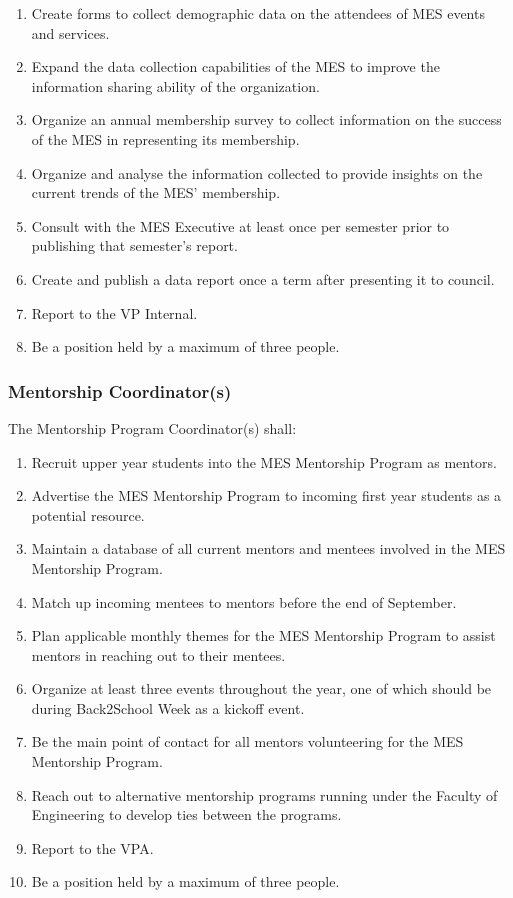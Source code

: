 \begin{enumerate}
 \item
  Create forms to collect demographic data on the attendees of MES events and services.
 \item
  Expand the data collection capabilities of the MES to improve the information sharing ability of the organization.
 \item
  Organize an annual membership survey to collect information on the success of the MES in representing its membership.
 \item
  Organize and analyse the information collected to provide insights on the current trends of the MES' membership.
 \item
  Consult with the MES Executive at least once per semester prior to publishing that semester's report.
 \item
  Create and publish a data report once a term after presenting it to council.
 \item
  Report to the VP Internal.
 \item
  Be a position held by a maximum of three people.
\end{enumerate}

\subsubsection{Mentorship Coordinator(s)}
\label{mentorship-coordinators}
The Mentorship Program Coordinator(s) shall:

\begin{enumerate}
 \item
  Recruit upper year students into the MES Mentorship Program as mentors.
 \item
  Advertise the MES Mentorship Program to incoming first year students as a potential resource.
 \item
  Maintain a database of all current mentors and mentees involved in the MES Mentorship Program.
 \item
  Match up incoming mentees to mentors before the end of September.
 \item
  Plan applicable monthly themes for the MES Mentorship Program to assist mentors in reaching out to their mentees.
 \item
  Organize at least three events throughout the year, one of which should be during Back2School Week as a kickoff event.
 \item
  Be the main point of contact for all mentors volunteering for the MES Mentorship Program.
 \item
  Reach out to alternative mentorship programs running under the Faculty of Engineering to develop ties between the programs.
 \item
  Report to the VPA.
 \item
  Be a position held by a maximum of three people.

\end{enumerate}

